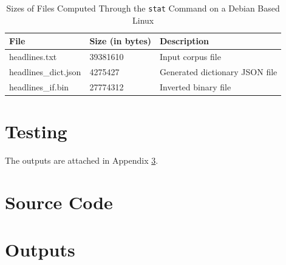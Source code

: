 \documentclass[11pt]{article}
\begin{document}
\begin{table}[h]
    \begin{center}
        
        \begin{tabular}{| l | l | l |}
        \hline
        \textbf{File} & \textbf{Size (in bytes)} & \textbf{Description} \\
        \hline
        headlines.txt & 39381610 & Input corpus file \\
        headlines\_dict.json & 4275427 & Generated dictionary JSON file \\
        headlines\_if.bin & 27774312 & Inverted binary file \\
        \hline
        \end{tabular}

    \end{center}
    \caption{Sizes of Files Computed Through the \texttt{stat} Command on a Debian Based Linux}

\end{table}


\section{Testing}

The outputs are attached in Appendix \ref{appendix:outputs}.

\appendix

\section{Source Code} \label{appendix:src}



\section{Outputs} \label{appendix:outputs}

% 

\end{document}
